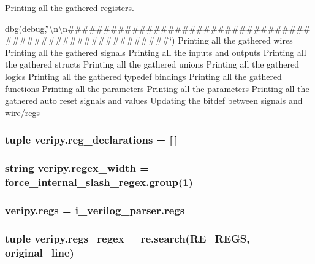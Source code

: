 Printing all the gathered registers. 

dbg(debug,\char`\"{}\textbackslash{}n\textbackslash{}n\#\#\#\#\#\#\#\#\#\#\#\#\#\#\#\#\#\#\#\#\#\#\#\#\#\#\#\#\#\#\#\#\#\#\#\#\#\#\#\#\#\#\#\#\#\#\#\#\#\#\#\#\#\#\#\#\#\char`\"{}) Printing all the gathered wires Printing all the gathered signals Printing all the inputs and outputs Printing all the gathered structs Printing all the gathered unions Printing all the gathered logics Printing all the gathered typedef bindings Printing all the gathered functions Printing all the parameters Printing all the parameters Printing all the gathered auto reset signals and values Updating the bitdef between signals and wire/regs \hypertarget{namespaceveripy_a8e6f82dc889c14d2c0a5f7eff6fa3e5b}{
\subsubsection[{reg\-\_\-declarations}]{\setlength{\rightskip}{0pt plus 5cm}tuple veripy.\-reg\-\_\-declarations = \mbox{[}$\,$\mbox{]}}}\label{namespaceveripy_a8e6f82dc889c14d2c0a5f7eff6fa3e5b}
\hypertarget{namespaceveripy_a5e677540fde9f9052f3c7c5a7d12243c}{
\subsubsection[{regex\-\_\-width}]{\setlength{\rightskip}{0pt plus 5cm}string veripy.\-regex\-\_\-width = force\-\_\-internal\-\_\-slash\-\_\-regex.\-group(1)}}\label{namespaceveripy_a5e677540fde9f9052f3c7c5a7d12243c}
\hypertarget{namespaceveripy_a31f321b7a4d58971598311ec1e9d65d5}{
\subsubsection[{regs}]{\setlength{\rightskip}{0pt plus 5cm}veripy.\-regs = i\-\_\-verilog\-\_\-parser.\-regs}}\label{namespaceveripy_a31f321b7a4d58971598311ec1e9d65d5}
\hypertarget{namespaceveripy_a115fffb30dfd5bc7abf758cd49319c4b}{
\subsubsection[{regs\-\_\-regex}]{\setlength{\rightskip}{0pt plus 5cm}tuple veripy.\-regs\-\_\-regex = re.\-search(R\-E\-\_\-\-R\-E\-G\-S, {\bf original\-\_\-line})}}\label{namespaceveripy_a115fffb30dfd5bc7abf758cd49319c4b}


